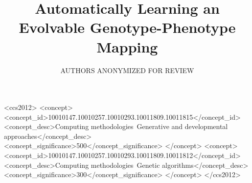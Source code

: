 \documentclass[sigconf]{acmart}
\begin{document}
\title{Automatically Learning an Evolvable Genotype-Phenotype Mapping}

\author{AUTHORS ANONYMIZED FOR REVIEW}
%
%

\begin{abstract}

\end{abstract}

%
%
\begin{CCSXML}
<ccs2012>
<concept>
<concept_id>10010147.10010257.10010293.10011809.10011815</concept_id>
<concept_desc>Computing methodologies~Generative and developmental approaches</concept_desc>
<concept_significance>500</concept_significance>
</concept>
<concept>
<concept_id>10010147.10010257.10010293.10011809.10011812</concept_id>
<concept_desc>Computing methodologies~Genetic algorithms</concept_desc>
<concept_significance>300</concept_significance>
</concept>
</ccs2012>
\end{CCSXML}



\maketitle





\end{document}
